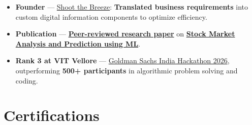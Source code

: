 \documentclass[a4paper,11pt]{article}
\newcommand{\ulink}[2]{\href{#1}{#2}}
\begin{document}
\begin{itemize}[nosep, leftmargin=1.5em, itemsep=2pt, topsep=2pt]
  \item {\color[HTML]{0A0A0A}\fontsize{11}{14}\selectfont \textbf{Founder} --- \ulink{https://shoot-the-breeze.vercel.app}{Shoot the Breeze}: \textbf{Translated business requirements} into custom digital information components to optimize efficiency.}
  \item {\color[HTML]{0A0A0A}\fontsize{11}{14}\selectfont \textbf{Publication} --- \ulink{https://www.elruha.org/_files/ugd/614b1f_6b95e1b697bf452b9907ba46e0151c05.pdf\#page=774}{\textbf{Peer-reviewed research paper}} on \ulink{https://github.com/su-jin1425/Set-Project}{\textbf{Stock Market Analysis and Prediction using ML}}.}
  \item {\color[HTML]{0A0A0A}\fontsize{11}{14}\selectfont \textbf{Rank 3 at VIT Vellore} --- \ulink{https://www.hackerrank.com/contests/goldman-sachs-india-hackathon-2026-cs/leaderboard}{Goldman Sachs India Hackathon 2026}, outperforming \textbf{500+ participants} in algorithmic problem solving and coding.}
\end{itemize}

\section{Certifications}
\vspace{2pt}
\end{document}
